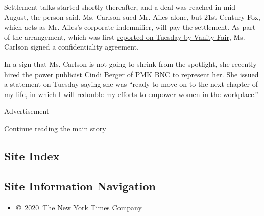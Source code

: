 Settlement talks started shortly thereafter, and a deal was reached in
mid-August, the person said. Ms. Carlson sued Mr. Ailes alone, but 21st
Century Fox, which acts as Mr. Ailes's corporate indemnifier, will pay
the settlement. As part of the arrangement, which was first
\href{http://www.vanityfair.com/news/2016/09/fox-news-settles-with-gretchen-carlson-for-20-million}{reported
on Tuesday by Vanity Fair}, Ms. Carlson signed a confidentiality
agreement.

In a sign that Ms. Carlson is not going to shrink from the spotlight,
she recently hired the power publicist Cindi Berger of PMK BNC to
represent her. She issued a statement on Tuesday saying she was ``ready
to move on to the next chapter of my life, in which I will redouble my
efforts to empower women in the workplace.''

Advertisement

\protect\hyperlink{after-bottom}{Continue reading the main story}

\hypertarget{site-index}{%
\subsection{Site Index}\label{site-index}}

\hypertarget{site-information-navigation}{%
\subsection{Site Information
Navigation}\label{site-information-navigation}}

\begin{itemize}
\tightlist
\item
  \href{https://help.nytimes3xbfgragh.onion/hc/en-us/articles/115014792127-Copyright-notice}{©~2020~The
  New York Times Company}
\end{itemize}


